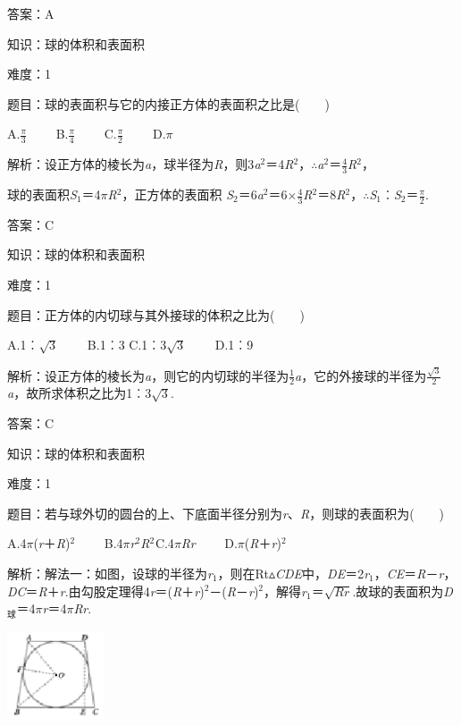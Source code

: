 \documentclass{article} %
\begin{document}
答案：A

知识：球的体积和表面积

难度：1

题目：球的表面积与它的内接正方体的表面积之比是(　　)

A.$\frac{\pi}{3}$　　 B.$\frac{\pi}{4}$　　 C.$\frac{\pi}{2}$　　 D.$\pi$

解析：设正方体的棱长为\textit{a}，球半径为\textit{R}，则3\textit{a}${}^{2}$＝4\textit{R}${}^{2}$，$\mathrm{\therefore}$\textit{a}${}^{2}$＝$\frac{4}{3}$\textit{R}${}^{2}$，

球的表面积\textit{S}${}_{1}$＝4$\pi$\textit{R}${}^{2}$，正方体的表面积 \textit{S}${}_{2}$＝6\textit{a}${}^{2}$＝6$\mathrm{\times}\frac{4}{3}$\textit{R}${}^{2}$＝8\textit{R}${}^{2}$，$\mathrm{\therefore}$\textit{S}${}_{1}$︰\textit{S}${}_{2}$＝$\frac{\pi}{2}$.

答案：C

知识：球的体积和表面积

难度：1

题目：正方体的内切球与其外接球的体积之比为(　　)

A.1︰$\sqrt{3}$　　 B.1︰3 C.1︰3$\sqrt{3}$　　 D.1︰9

解析：设正方体的棱长为\textit{a}，则它的内切球的半径为$\frac{1}{2}$\textit{a}，它的外接球的半径为$\frac{\sqrt{3}}{2}$\textit{a}，故所求体积之比为1︰3$\sqrt{3}$.

答案：C

知识：球的体积和表面积

难度：1

题目：若与球外切的圆台的上、下底面半径分别为\textit{r}、\textit{R}，则球的表面积为(　　)

A.4$\pi$(\textit{r}＋\textit{R})${}^{2}$　　 B.4$\pi$\textit{r}${}^{2}$\textit{R}${}^{2}$${}^{ }$C.4$\pi$\textit{Rr}　　 D.$\pi$(\textit{R}＋\textit{r})${}^{2}$

解析：解法一：如图，设球的半径为\textit{r}${}_{1}$，则在Rt$\mathrm{\vartriangle}$\textit{CDE}中，\textit{DE}＝2\textit{r}${}_{1}$，\textit{CE}＝\textit{R}－\textit{r}，\textit{DC}＝\textit{R}＋\textit{r}.由勾股定理得4\textit{r}＝(\textit{R}＋\textit{r})${}^{2}$－(\textit{R}－\textit{r})${}^{2}$，解得\textit{r}${}_{1}$＝$\sqrt{Rr}$.故球的表面积为\textit{D}${}_{\textrm{球}}$＝4$\pi$\textit{r}＝4$\pi$\textit{Rr}.

\includegraphics*[width=1.13in, height=1.02in, keepaspectratio=false]{image76}
\end{document}
